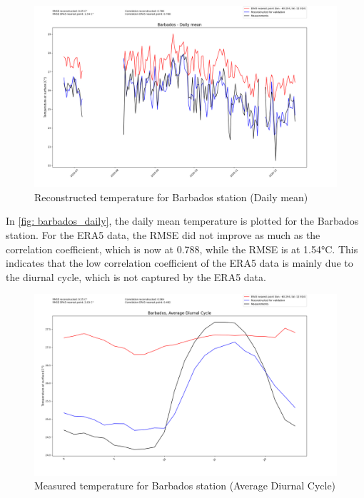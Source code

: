 \begin{figure}
    \centering
    \includegraphics[width=1.00\textwidth]{resources/images/charts/barbados_eval_grib_final/Barbados - Daily mean.png}
    \caption{Reconstructed temperature for Barbados station (Daily mean)}
    \label{fig: barbados_daily}
\end{figure}

In \autoref{fig: barbados_daily}, the daily mean temperature is plotted for the Barbados station. For the ERA5 data, the RMSE did not improve as much as the correlation coefficient, which is now at 0.788, while the RMSE is at 1.54°C. This indicates that the low correlation coefficient of the ERA5 data is mainly due to the diurnal cycle, which is not captured by the ERA5 data. 

\begin{figure}
    \centering
    \includegraphics[width=1.00\textwidth]{resources/images/charts/barbados_eval_grib_final/Barbados, Average Diurnal Cycle.png}
    \caption{Measured temperature for Barbados station (Average Diurnal Cycle)}
    \label{fig: barbados_diurnal}
\end{figure}

